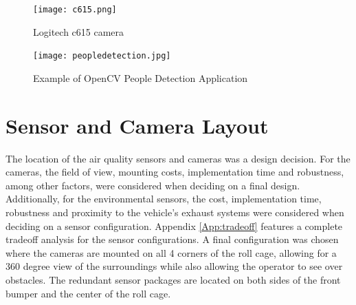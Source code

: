 \begin{figure}[H]
	\centering
	\texttt{[image: c615.png]}
	\caption{Logitech c615 camera}
	\label{fig:logitechcam}
\end{figure}
\begin{figure}[H]
	\centering
	\texttt{[image: peopledetection.jpg]}
	\caption{Example of OpenCV People Detection Application}
	\label{fig:peopledetect}
	\end{figure}

\section{Sensor and Camera Layout}

The location of the air quality sensors and cameras was a design decision. For the cameras, the field of view, mounting costs, implementation time and robustness, among other factors, were considered when deciding on a final design. Additionally, for the environmental sensors, the cost, implementation time, robustness and proximity to the vehicle's exhaust systems were considered when deciding on a sensor configuration. Appendix \ref{App:tradeoff} features a complete tradeoff analysis for the sensor configurations. A final configuration was chosen where the cameras are mounted on all 4 corners of the roll cage, allowing for a 360 degree view of the surroundings while also allowing the operator to see over obstacles. The redundant sensor packages are located on both sides of the front bumper and the center of the roll cage. 

